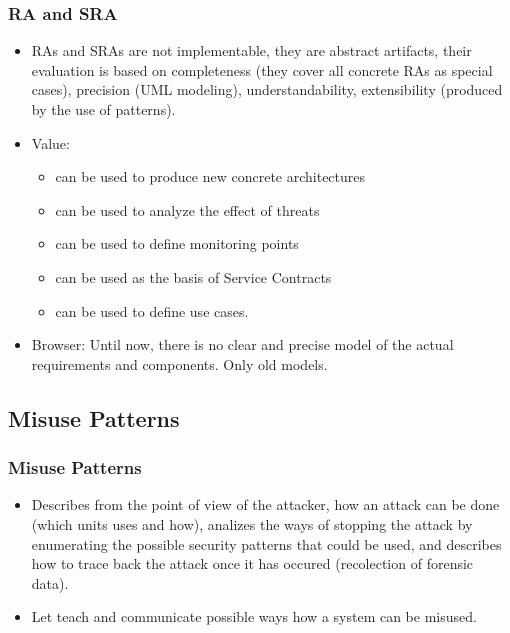 \documentclass[serif,9pt]{beamer}
\begin{document}
\begin{frame}
	\frametitle{RA and SRA}
	\begin{itemize}
		\item<1-> RAs and SRAs are not implementable, they are abstract artifacts, their evaluation is based on completeness (they cover all concrete RAs as special cases), precision (UML modeling), understandability, extensibility (produced by the use of patterns).
		\item<1-> Value: 
			\begin{itemize}
				\item<2-> can be used to produce new concrete architectures
				\item<2-> can be used to analyze the effect of threats
				\item<3-> can be used to define monitoring points
				\item<3-> can be used as the basis of Service Contracts
				\item<3-> can be used to define use cases.
			\end{itemize}
		\item<4-> Browser: Until now, there is no clear and precise model of the actual requirements and components. Only old models.
	\end{itemize}
\end{frame}


\subsection{Misuse Patterns}
\begin{frame}
	\frametitle{Misuse Patterns}
	\begin{itemize}
		\item<1-> Describes from the point of view of the attacker, how an attack can be done (which units uses and how), analizes the ways of stopping the attack by enumerating the possible security patterns that could be used, and describes how to trace back the attack once it has occured (recolection of forensic data).
		\item<2-> Let teach and communicate possible ways how a system can be misused.
	\end{itemize}
\end{frame}
\end{document}
